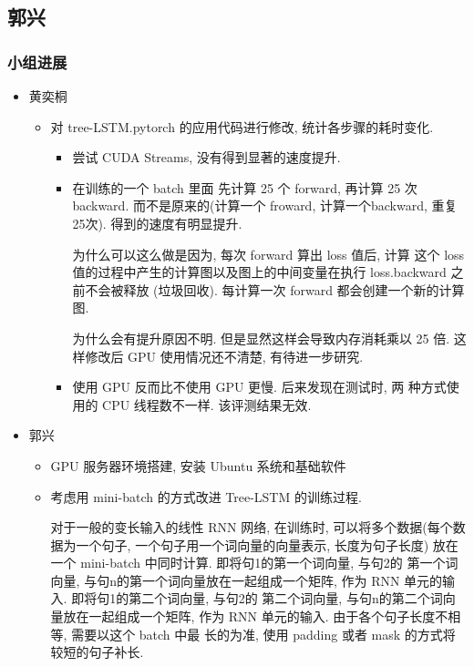 \subsection{郭兴}

\subsubsection{小组进展}

\begin{itemize}
	\item
	      黄奕桐
	      \begin{itemize}
              \item
                  对 tree-LSTM.pytorch 的应用代码进行修改, 统计各步骤的耗时变化.
                  \begin{itemize}
                      \item 尝试 CUDA Streams, 没有得到显著的速度提升.
                      \item 在训练的一个 batch 里面 先计算 25 个 forward, 再计算 25 次
                          backward. 而不是原来的(计算一个 froward, 计算一个backward,
				  重复25次). 得到的速度有明显提升.

				  为什么可以这么做是因为, 每次 forward 算出 loss 值后, 计算
				  这个 loss 值的过程中产生的计算图以及图上的中间变量在执行 loss.backward 之前不会被释放
				  (垃圾回收). 每计算一次 forward 都会创建一个新的计算图.

				  为什么会有提升原因不明. 但是显然这样会导致内存消耗乘以
				  25 倍. 这样修改后 GPU 使用情况还不清楚, 有待进一步研究.
			   \item 使用 GPU 反而比不使用 GPU 更慢. 后来发现在测试时, 两
			   种方式使用的 CPU 线程数不一样. 该评测结果无效.
                  \end{itemize}
          \end{itemize}

	\item
	      郭兴
	      \begin{itemize}
		      \item
                    GPU 服务器环境搭建, 安装 Ubuntu 系统和基础软件
		      \item
			考虑用 mini-batch 的方式改进 Tree-LSTM 的训练过程.

			对于一般的变长输入的线性 RNN 网络, 在训练时, 可以将多个数据(每个数
			据为一个句子, 一个句子用一个词向量的向量表示, 长度为句子长度)
			放在一个 mini-batch 中同时计算. 即将句1的第一个词向量, 与句2的
			第一个词向量, 与句n的第一个词向量放在一起组成一个矩阵, 作为
			RNN 单元的输入.  即将句1的第二个词向量, 与句2的
			第二个词向量, 与句n的第二个词向量放在一起组成一个矩阵, 作为
			RNN 单元的输入. 由于各个句子长度不相等, 需要以这个 batch 中最
			长的为准, 使用 padding 或者 mask 的方式将较短的句子补长.


\end{itemize}
\end{itemize}
